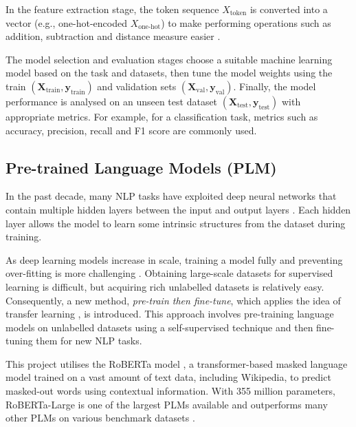 In the feature extraction stage, the token sequence $X_\text{token}$ is converted into a vector (e.g., one-hot-encoded $X_{\text{one-hot}}$) to make performing operations such as addition, subtraction and distance measure easier \cite{Almeida19wordembedding, Salton75VSM}.   

The model selection and evaluation stages choose a suitable machine learning model based on the task and datasets, then tune the model weights using the train $(\mathbf{X}_{\text{train}}, \mathbf{y}_{\text{train}})$ and validation sets $(\mathbf{X}_\text{val}, \mathbf{y}_\text{val})$. Finally, the model performance is analysed on an unseen test dataset $(\mathbf{X}_\text{test}, \mathbf{y}_\text{test})$ with appropriate metrics. For example, for a classification task, metrics such as accuracy, precision, recall and F1 score are commonly used. 

\subsection{Pre-trained Language Models (PLM)} 
In the past decade, many NLP tasks have exploited deep neural networks that contain multiple hidden layers between the input and output layers \cite{Yann15dnn}. Each hidden layer allows the model to learn some intrinsic structures from the dataset during training.

As deep learning models increase in scale, training a model fully and preventing over-fitting is more challenging \cite{Qiu20PLM}. Obtaining large-scale datasets for supervised learning is difficult, but acquiring rich unlabelled datasets is relatively easy. Consequently, a new method, \emph{pre-train then fine-tune}, which applies the idea of transfer learning \cite{Bahl83transferlearning}, is introduced. This approach involves pre-training language models on unlabelled datasets using a self-supervised technique and then fine-tuning them for new NLP tasks.

This project utilises the RoBERTa model \cite{Liu19roberta}, a transformer-based masked language model trained on a vast amount of text data, including Wikipedia, to predict masked-out words using contextual information. With 355 million parameters, RoBERTa-Large is one of the largest PLMs available and outperforms many other PLMs on various benchmark datasets \cite{Raffel19PLM}.

